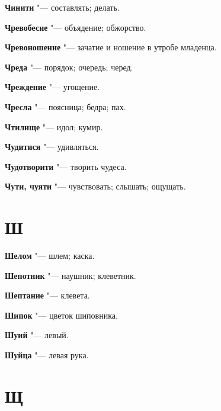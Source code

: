 \begin{mymulticols}{2}
\noindent\textbf{Чинити} "--- составлять; делать. 




\noindent\textbf{Чревобесие} "--- объядение; обжорство. 




\noindent\textbf{Чревоношение} "--- зачатие и ношение в утробе младенца. 




\noindent\textbf{Чреда} "--- порядок; очередь; черед. 




\noindent\textbf{Чреждение} "--- угощение. 




\noindent\textbf{Чресла} "--- поясница; бедра; пах. 




\noindent\textbf{Чтилище} "--- идол; кумир. 




\noindent\textbf{Чудитися} "--- удивляться. 




\noindent\textbf{Чудотворити} "--- творить чудеса. 




\noindent\textbf{Чути, чуяти} "--- чувствовать; слышать; ощущать. 




\section{Ш}





\noindent\textbf{Шелом} "--- шлем; каска. 




\noindent\textbf{Шепотник} "--- наушник; клеветник. 




\noindent\textbf{Шептание} "--- клевета. 




\noindent\textbf{Шипок} "--- цветок шиповника. 




\noindent\textbf{Шуий} "--- левый. 




\noindent\textbf{Шуйца} "--- левая рука. 




\section{Щ}






\end{mymulticols}
